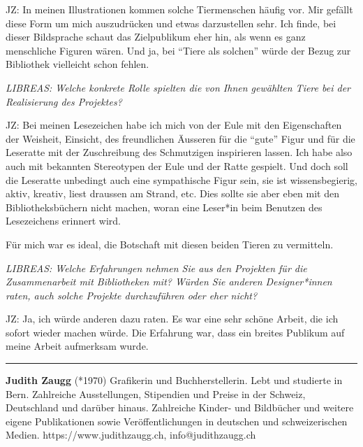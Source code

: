 \documentclass[a4paper,
fontsize=11pt,
oneside,
numbers=noperiodatend,
parskip=half-,
bibliography=totoc,
final
]{scrartcl}
\begin{document}
JZ: In meinen Illustrationen kommen solche Tiermenschen häufig vor. Mir
gefällt diese Form um mich auszudrücken und etwas darzustellen sehr. Ich
finde, bei dieser Bildsprache schaut das Zielpublikum eher hin, als wenn
es ganz menschliche Figuren wären. Und ja, bei \enquote{Tiere als
solchen} würde der Bezug zur Bibliothek vielleicht schon fehlen.

\emph{LIBREAS: Welche konkrete Rolle spielten die von Ihnen gewählten
Tiere bei der Realisierung des Projektes?}

JZ: Bei meinen Lesezeichen habe ich mich von der Eule mit den
Eigenschaften der Weisheit, Einsicht, des freundlichen Äusseren für die
\enquote{gute} Figur und für die Leseratte mit der Zuschreibung des
Schmutzigen inspirieren lassen. Ich habe also auch mit bekannten
Stereotypen der Eule und der Ratte gespielt. Und doch soll die Leseratte
unbedingt auch eine sympathische Figur sein, sie ist wissensbegierig,
aktiv, kreativ, liest draussen am Strand, etc. Dies sollte sie aber eben
mit den Bibliotheksbüchern nicht machen, woran eine Leser*in beim
Benutzen des Lesezeichens erinnert wird.

Für mich war es ideal, die Botschaft mit diesen beiden Tieren zu
vermitteln.

\emph{LIBREAS: Welche Erfahrungen nehmen Sie aus den Projekten für die
Zusammenarbeit mit Bibliotheken mit? Würden Sie anderen Designer*innen
raten, auch solche Projekte durchzuführen oder eher nicht?}

JZ: Ja, ich würde anderen dazu raten. Es war eine sehr schöne Arbeit,
die ich sofort wieder machen würde. Die Erfahrung war, dass ein breites
Publikum auf meine Arbeit aufmerksam wurde.

\begin{center}\rule{0.5\linewidth}{0.5pt}\end{center}

\textbf{Judith Zaugg} (*1970) Grafikerin
und Buchherstellerin. Lebt und studierte in Bern. Zahlreiche
Ausstellungen, Stipendien und Preise in der Schweiz, Deutschland und
darüber hinaus. Zahlreiche Kinder- und Bildbücher und weitere eigene
Publikationen sowie Veröffentlichungen in deutschen und schweizerischen
Medien. https://www.judithzaugg.ch, info@judithzaugg.ch
\end{document}
